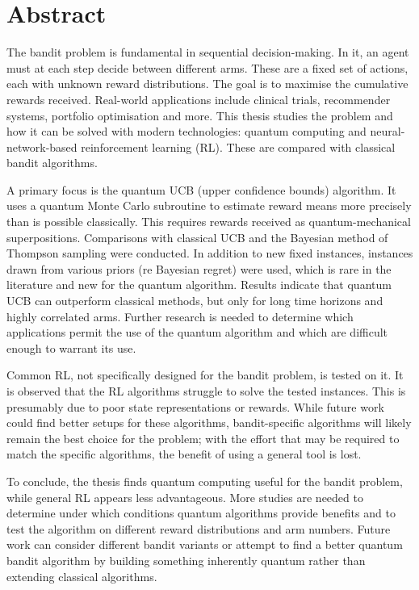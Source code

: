 \chapter{Abstract}
The bandit problem is fundamental in sequential decision-making.
In it, an agent must at each step decide between different arms.
These are a fixed set of actions, each with unknown reward distributions.
The goal is to maximise the cumulative rewards received.
Real-world applications include clinical trials, recommender systems, portfolio optimisation and more.
This thesis studies the problem and how it can be solved with modern technologies: quantum computing and neural-network-based reinforcement learning (RL).
These are compared with classical bandit algorithms.

A primary focus is the quantum UCB (upper confidence bounds) algorithm.
It uses a quantum Monte Carlo subroutine to estimate reward means more precisely than is possible classically.
This requires rewards received as quantum-mechanical superpositions.
Comparisons with classical UCB and the Bayesian method of Thompson sampling were conducted.
In addition to new fixed instances, instances drawn from various priors (re Bayesian regret) were used, which is rare in the literature and new for the quantum algorithm.
Results indicate that quantum UCB can outperform classical methods, but only for long time horizons and highly correlated arms.
Further research is needed to determine which applications permit the use of the quantum algorithm and which are difficult enough to warrant its use.

Common RL, not specifically designed for the bandit problem, is tested on it.
It is observed that the RL algorithms struggle to solve the tested instances.
This is presumably due to poor state representations or rewards.
While future work could find better setups for these algorithms, bandit-specific algorithms will likely remain the best choice for the problem; with the effort that may be required to match the specific algorithms, the benefit of using a general tool is lost.

To conclude, the thesis finds quantum computing useful for the bandit problem, while general RL appears less advantageous.
More studies are needed to determine under which conditions quantum algorithms provide benefits and to test the algorithm on different reward distributions and arm numbers.
Future work can consider different bandit variants or attempt to find a better quantum bandit algorithm by building something inherently quantum rather than extending classical algorithms.



\cleardoublepage